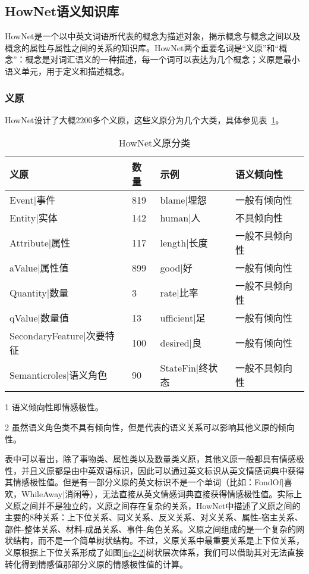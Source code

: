\subsection{HowNet语义知识库}
HowNet是一个以中英文词语所代表的概念为描述对象，揭示概念与概念之间以及概念的属性与属性之间的关系的知识库。HowNet两个重要名词是“义原”和“概念”：概念是对词汇语义的一种描述，每一个词可以表达为几个概念；义原是最小语义单元，用于定义和描述概念。
\subsubsection{义原} 
HowNet设计了大概2200多个义原，这些义原分为几个大类，具体参见表~\ref{tab2-1}。

\begin{table}[htp]
\centering
\caption{HowNet义原分类}
\label{tab2-1}
\begin{threeparttable}
 \begin{tabular}{|l|l|l|l|}
 \hline
 义原&数量& 示例&语义倾向性\tnote{1}\\
 \hline
 Event$ | $事件& 819& blame$ | $埋怨& 一般有倾向性\\
 \hline
Entity$ | $实体& 142& human$ | $人 & 不具倾向性\\
\hline
Attribute$ | $属性& 117 & length$ | $长度 &一般不具倾向性\\
\hline
aValue$ | $属性值& 899 & good$ | $好 &一般有倾向性\\
\hline
Quantity$ | $数量& 3 & rate$ | $比率 & 一般不具倾向性\\
\hline
qValue$ | $数量值& 13 & ufficient$ | $足 & 一般有倾向性\\
\hline
SecondaryFeature$ | $次要特征& 100 & desired$ | $良&一般有倾向性\\
\hline
Semanticroles$ | $语义角色& 90 & StateFin$ | $终状态 & 一般不具倾向性\tnote{2}\\
 \hline
\end{tabular}
\begin{tablenotes}
  \footnotesize
\item[1]语义倾向性即情感极性。
\item[2]虽然语义角色类不具有倾向性，但是代表的语义关系可以影响其他义原的倾向性。
\end{tablenotes}
\end{threeparttable}
\end{table}

表中可以看出，除了事物类、属性类以及数量类义原，其他义原一般都具有情感极性，并且义原都是由中英双语标识，因此可以通过英文标识从英文情感词典中获得其情感极性值。但是有一部分义原的英文标识不是一个单词（比如：FondOf$ | $喜欢，WhileAway$ | $消闲等），无法直接从英文情感词典直接获得情感极性值。实际上义原之间并不是独立的，义原之间存在复杂的关系，HowNet中描述了义原之间的主要的8种关系：上下位关系、同义关系、反义关系、对义关系、属性-宿主关系、部件-整体关系、材料-成品关系、事件-角色关系。义原之间组成的是一个复杂的网状结构，而不是一个简单树状结构。不过，义原关系中最重要关系是上下位关系，义原根据上下位关系形成了如图\ref{fig2-2}树状层次体系，我们可以借助其对无法直接转化得到情感值那部分义原的情感极性值的计算。

